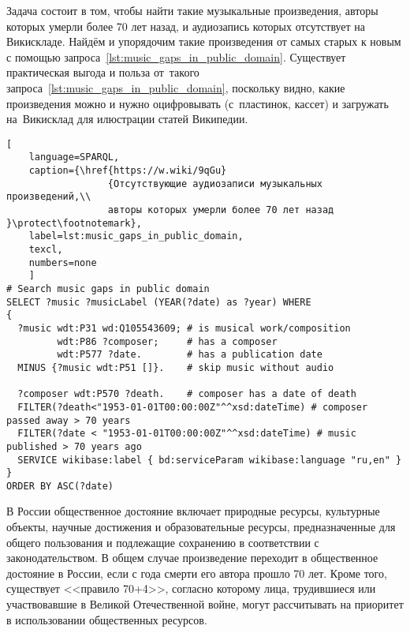 Задача состоит в том, чтобы найти такие музыкальные произведения, 
авторы которых умерли более 70 лет назад, 
и аудиозапись которых отсутствует на Викискладе. 
Найдём и упорядочим такие произведения от самых старых к новым 
с помощью запроса~\ref{lst:music_gaps_in_public_domain}. 
Существует практическая выгода и польза от~такого запроса~\ref{lst:music_gaps_in_public_domain}, 
поскольку видно, какие произведения можно и нужно оцифровывать 
(с~пластинок, кассет) и загружать на~Викисклад для илюстрации статей Википедии.

\begin{lstlisting}[ 
    language=SPARQL,
    caption={\href{https://w.wiki/9qGu}
                  {Отсутствующие аудиозаписи музыкальных произведений,\\
                  авторы которых умерли более 70 лет назад }\protect\footnotemark},
    label=lst:music_gaps_in_public_domain,
    texcl,
    numbers=none
    ]
# Search music gaps in public domain
SELECT ?music ?musicLabel (YEAR(?date) as ?year) WHERE 
{
  ?music wdt:P31 wd:Q105543609; # is musical work/composition
         wdt:P86 ?composer;     # has a composer
         wdt:P577 ?date.        # has a publication date
  MINUS {?music wdt:P51 []}.	# skip music without audio 
  
  ?composer wdt:P570 ?death.    # composer has a date of death
  FILTER(?death<"1953-01-01T00:00:00Z"^^xsd:dateTime) # composer passed away > 70 years
  FILTER(?date < "1953-01-01T00:00:00Z"^^xsd:dateTime) # music published > 70 years ago
  SERVICE wikibase:label { bd:serviceParam wikibase:language "ru,en" }
}
ORDER BY ASC(?date)
\end{lstlisting}%

В России общественное достояние включает природные ресурсы, культурные объекты, 
научные достижения и образовательные ресурсы, 
предназначенные для общего пользования и подлежащие сохранению в соответствии с законодательством. 
В общем случае произведение переходит в общественное достояние в России, 
если с года смерти его автора прошло 70 лет. 
Кроме того, существует <<правило 70+4>>, согласно которому лица, 
трудившиеся или участвовавшие в Великой Отечественной войне, 
могут рассчитывать на приоритет в использовании общественных ресурсов.            



